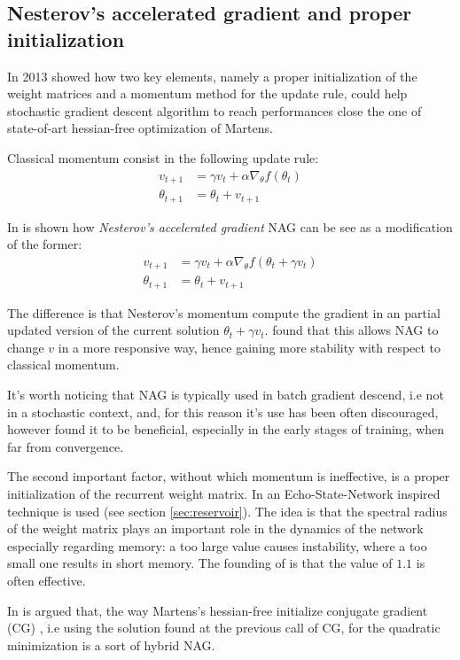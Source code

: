 \subsection{Nesterov's accelerated gradient and proper initialization} 


In 2013 \cite{nesterovAndInitialization} showed how two key elements, namely a proper initialization of the weight 
matrices and a momentum method for the update rule, could help stochastic gradient descent algorithm to reach 
performances close the one of state-of-art hessian-free optimization of Martens\cite{hessianFree}.

Classical momentum \cite{momentum} consist in the following update rule:
\begin{align}
v_{t+1} &= \gamma v_t+ \alpha \nabla_\theta f(\theta_t)\\
\theta_{t+1} &= \theta_t + v_{t+1}
\label{eq:classicMomentum}
\end{align}

In \cite{nesterovAndInitialization} is shown how \textit{Nesterov's accelerated gradient} NAG \cite{nesterov} can be 
see as a modification of the former:
\begin{align}
v_{t+1} &= \gamma v_t+ \alpha \nabla_\theta f(\theta_t+ \gamma v_t)\\
\theta_{t+1} &= \theta_t + v_{t+1}
\label{eq:nesterovMomentum}
\end{align}

The difference is that Nesterov's momentum compute the gradient in an partial updated version of the current solution 
$\theta_t+\gamma v_t$. \cite{nesterovAndInitialization} found that this allows NAG to change $v$ in a more responsive 
way, hence gaining more stability with respect to classical momentum.

It's worth noticing that NAG is typically used in batch gradient descend, i.e not in a stochastic context, and, for 
this reason it's use has been often discouraged, however \cite{nesterovAndInitialization} found it to be beneficial, 
especially in the early stages of training,  when far from convergence.


The second important factor, without which momentum is ineffective, is a proper initialization of the recurrent weight 
matrix. In \cite{nesterovAndInitialization} an Echo-State-Network inspired technique is used (see section 
\ref{sec:reservoir}).  The idea is that the spectral radius of the weight matrix plays an important role in the 
dynamics of the network especially regarding memory: a too large value causes instability, where a too small one 
results in short memory. The founding of \cite{nesterovAndInitialization} is that the value of $1.1$ is often effective.


In \cite{nesterovAndInitialization} is argued that, the way Martens's hessian-free initialize conjugate gradient (CG) 
, i.e using the solution found at the previous call of CG, for the quadratic minimization is a sort of hybrid NAG.




